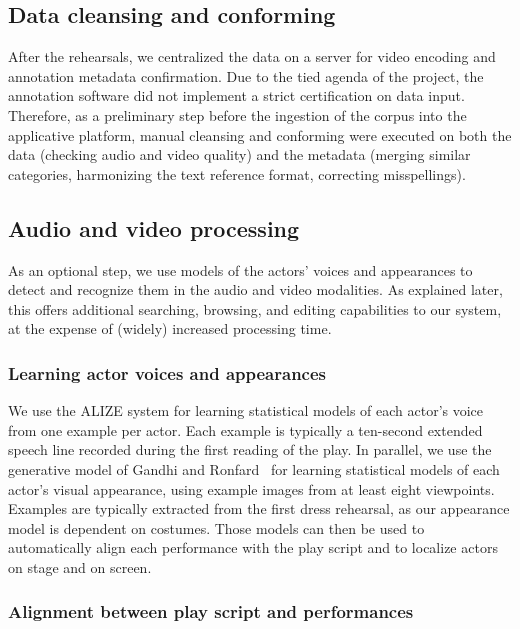 \documentclass[conference]{IEEEtran}
\newcommand{\todo}[1]{\noindent\textcolor{red}{{\bf \{ToDo} #1{\bf \}}}}
\begin{document}
\subsection{Data cleansing and conforming}
After the rehearsals, we centralized the data on a server for video encoding and annotation metadata confirmation. Due to the tied agenda of the project, the annotation software did not implement a strict certification on data input. Therefore, as a preliminary step before the ingestion of the corpus into the applicative platform, manual cleansing and conforming were executed on both the data (checking audio and video quality) and the metadata (merging similar categories, harmonizing the text reference format, correcting misspellings).

\subsection{Audio and video processing}
As an optional step, we use models of the actors' voices and appearances to detect and recognize them in the audio and video modalities. As explained later, this offers additional searching, browsing, and editing capabilities to our system, at the expense of (widely) increased processing time.

\subsubsection{Learning actor voices and appearances}
We use the ALIZE system for learning statistical models of each actor's voice~\cite{Bonastre05}  from one example per actor.
Each example is typically a ten-second extended speech line recorded during the first reading of the play. In parallel, we use the generative model of Gandhi and Ronfard~\cite{Gandhi13} for learning statistical models of each actor's visual appearance, using example images from at least eight viewpoints. Examples are typically extracted from the first dress rehearsal, as our appearance model is dependent on costumes.  Those models can then be used to automatically align each performance with the play script and to localize actors on stage and on screen. 

\subsubsection{Alignment between play script and performances}
\end{document}
